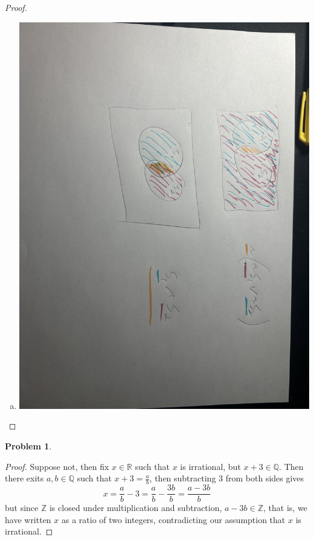 \documentclass{article}
\newcommand{\R}{\mathbb{R}}
\newcommand{\Q}{\mathbb{Q}}
\newcommand{\Z}{\mathbb{Z}}
\newtheorem{prb}{Problem}
\begin{document}
\begin{proof}
\begin{enumerate}[(a)]
			\item \includegraphics[scale=.1]{two.jpg}


	   	\end{enumerate}
	   \end{proof} 

	   \begin{prb}  \end{prb} 
	   \begin{proof} 
	   	Suppose not, then fix $x \in \R$ such that $x$ is irrational, but $x + 3 \in \Q$. Then there 
		exits $a, b \in \Q$ such that $x+3 = \frac{a}{b}$, then subtracting $3$ from both sides gives 
		\[ x = \frac{a}{b} - 3 = \frac{a}{b} - \frac{3b}{b} = \frac{a-3b}{b} \] 
		but since $\Z$ is closed under multiplication and subtraction, $a - 3b \in \Z$, that is, 
		we have written $x$ as a ratio of two integers, contradicting our assumption that $x$ is irrational. 
	   \end{proof} 
\end{document}

